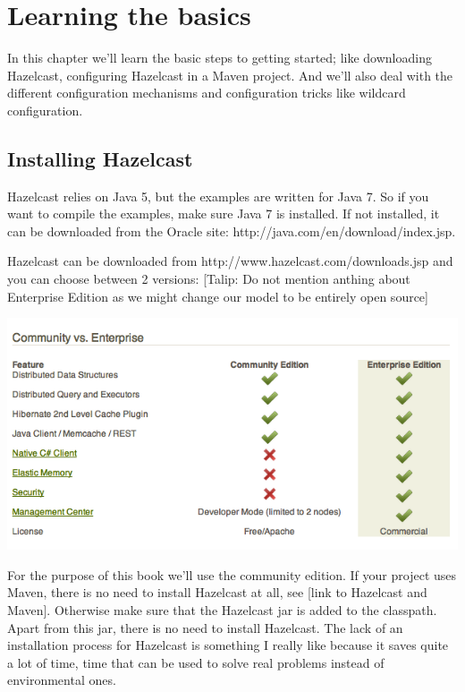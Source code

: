 \chapter{Learning the basics}
In this chapter we'll learn the basic steps to getting started; like downloading Hazelcast, configuring Hazelcast in a Maven project. And we'll also deal with the different configuration mechanisms and configuration tricks like wildcard configuration.

\section{Installing Hazelcast}
Hazelcast relies on Java 5, but the examples are written for Java 7. So if you want to compile the examples, make sure Java 7 is installed. If not installed, it can be downloaded from the Oracle site: http://java.com/en/download/index.jsp.

Hazelcast can be downloaded from http://www.hazelcast.com/downloads.jsp and you can choose between 2 versions:
[Talip: Do not mention anthing about Enterprise Edition as we might change our model to be entirely open source]

\includegraphics[scale=0.60]{hazelcast-editions.png}

For the purpose of this book we'll use the community edition. If your project uses Maven, there is no need to install Hazelcast at all, see [link to Hazelcast and Maven]. Otherwise make sure that the Hazelcast jar is added to the classpath. Apart from this jar, there is no need to install Hazelcast. The lack of an installation process for Hazelcast is something I really like because it saves quite a lot of time, time that can be used to solve real problems instead of environmental ones.


